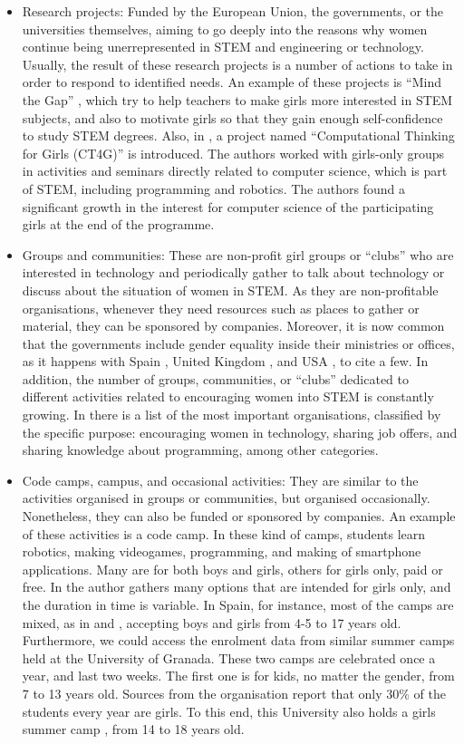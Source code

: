 \documentclass[journal,transmag]{IEEEtran}
\begin{document}
\begin{itemize}
	\item Research projects: Funded by the European Union, the governments, or the universities themselves, aiming to go deeply into the reasons why women continue being unerrepresented in STEM and engineering or technology. Usually, the result of these research projects is a number of actions to take in order to respond to identified needs. An example of these projects is ``Mind the Gap'' \cite{mtg:site}, which try to help teachers to make girls more interested in STEM subjects, and also to motivate girls so that they gain enough self-confidence to study STEM degrees. Also, in \cite{brady2016all}, a project named ``Computational Thinking for Girls (CT4G)'' is introduced. The authors worked with girls-only groups in activities and seminars directly related to computer science, which is part of STEM, including programming and robotics. The authors found a significant growth in the interest for computer science of the participating girls at the end of the programme.
	\item Groups and communities: These are non-profit girl groups or ``clubs'' who are interested in technology and periodically gather to talk about technology or discuss about the situation of women in STEM. As they are non-profitable organisations, whenever they need resources such as places to gather or material, they can be sponsored by companies. Moreover, it is now common that the governments include gender equality inside their ministries or offices, as it happens with Spain \cite{inmujer:site}, United Kingdom \cite{ukgequ:site}, and USA \cite{uswomen:site, aauw:site}, to cite a few. In addition, the number of groups, communities, or ``clubs'' dedicated to different activities related to encouraging women into STEM is constantly growing. In \cite{kira2012} there is a list of the most important organisations, classified by the specific purpose: encouraging women in technology, sharing job offers, and sharing knowledge about programming, among other categories.
	\item Code camps, campus, and occasional activities: They are similar to the activities organised in groups or communities, but organised occasionally. Nonetheless, they can also be funded or sponsored by companies. An example of these activities is a code camp. In these kind of camps, students learn robotics, making videogames, programming, and making of smartphone applications. Many are for both boys and girls, others for girls only, paid or free. In \cite{lauren2015} the author gathers many options that are intended for girls only, and the duration in time is variable. In Spain, for instance, most of the camps are mixed, as in \cite{cmadrid:site} and \cite{cbcn:site}, accepting boys and girls from 4-5 to 17 years old. Furthermore, we could access the enrolment data from similar summer camps held at the University of Granada. These two camps are celebrated once a year, and last two weeks. The first one \cite{cinfant:site} is for kids, no matter the gender, from 7 to 13 years old. Sources from the organisation report that only 30\% of the students every year are girls. To this end, this University also holds a girls summer camp \cite{cchicas:site}, from 14 to 18 years old.

\end{itemize}
\end{document}
